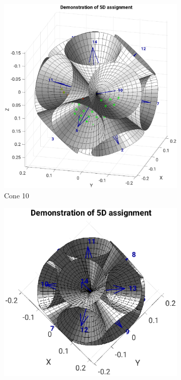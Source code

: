 \begin{figure}[H]
     \centering
     \begin{subfigure}[b]{0.49\textwidth}
         \centering
        \includegraphics[width=1.12\linewidth,right]{Graphics/Results/4d_5d/5thDim_over_4thDim_150_150_150_cones_10_center.eps}
         \caption{Cone 10}
         \label{fig:res:5th_4th_cones10}
     \end{subfigure}
     \hfill
     \begin{subfigure}[b]{0.49\textwidth}
         \centering
         \includegraphics[width=1.3\textwidth,right]{Graphics/Results/4d_5d/5thDim_over_4thDim_150_150_150_cones_14_center.eps}

\end{subfigure}
\end{figure}
